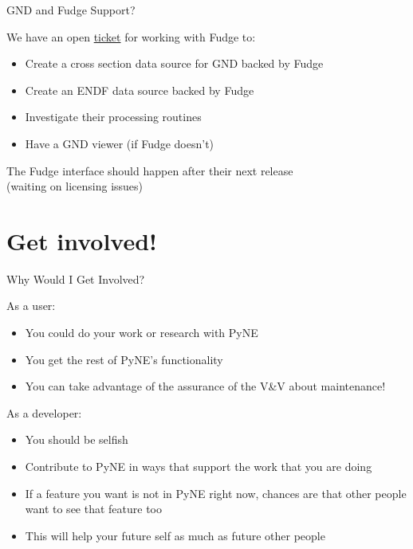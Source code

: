 \documentclass[xcolor=x11names,compress]{beamer}
\renewcommand{\(}{\begin{columns}}
\renewcommand{\)}{\end{columns}}
\newcommand{\<}[1]{\begin{column}{#1}}
\renewcommand{\>}{\end{column}}
\begin{document}
\begin{frame}{GND and Fudge Support?}

    We have an open \href{https://github.com/pyne/pyne/issues/236}{ticket}
    for working with \alert{Fudge} to: 

    \vspace*{1 em}

    \begin{itemize}
      \item Create a cross section data source for GND backed by Fudge
      \item Create an ENDF data source backed by Fudge
      \item Investigate their processing routines
      \item Have a GND viewer (if Fudge doesn't)
    \end{itemize}
    
    The Fudge interface should happen after their next release\\
    \hspace*{1.5 em}(waiting on licensing issues)

\end{frame}

\section{Get involved!}
\begin{frame}{Why Would I Get Involved?}

    \begin{block}{As a \alert{user}:}
    \begin{itemize}
      \item You could do your work or research with PyNE
      \item You get the rest of PyNE's functionality
      \item You can take advantage of the assurance of the V\&V 
      about maintenance!
    \end{itemize}
    \end{block}

    \vspace*{1 em}
    \begin{block}{As a \alert{developer}:}
    \begin{itemize}
      \item You should be selfish
      \item Contribute to PyNE in ways that support the work that you are doing
      \item If a feature you want is not in PyNE right now, chances are that other
      people want to see that feature too
      \item This will help your future self as much as future other people
    \end{itemize}
\end{block}

\end{frame}
\end{document}
